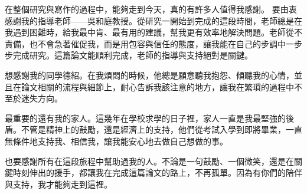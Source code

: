 \begin{Thanks}
    在整個研究與寫作的過程中，能夠走到今天，真的有許多人值得我感謝。
要由衷感謝我的指導老師——吳和庭教授。從研究一開始到完成的這段時間，老師總是在我遇到困難時，給我最中肯、最有用的建議，幫我更有效率地解決問題。老師從不責備，也不會急著催促我，而是用包容與信任的態度，讓我能在自己的步調中一步步完成研究。這篇論文能順利完成，老師的指導與支持絕對是關鍵。

想感謝我的同學德紹。在我煩悶的時候，他總是願意聽我抱怨、傾聽我的心情，並且在論文相關的流程與細節上，耐心告訴我該注意的地方，讓我在繁瑣的過程中不至於迷失方向。

最重要的還有我的家人。這幾年在學校求學的日子裡，家人一直是我最堅強的後盾。不管是精神上的鼓勵，還是經濟上的支持，他們從考試入學到即將畢業，一直無條件地支持我、相信我，讓我能安心地去做自己想做的事。

也要感謝所有在這段旅程中幫助過我的人。不論是一句鼓勵、一個微笑，還是在關鍵時刻伸出的援手，都讓我在完成這篇論文的路上，不再孤單。因為有你們的陪伴與支持，我才能夠走到這裡。
\end{Thanks}